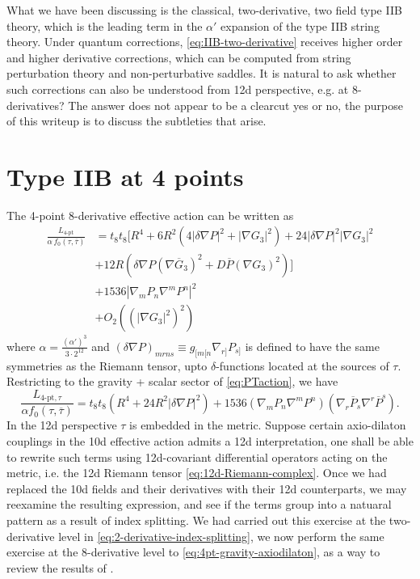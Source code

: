 What we have been discussing is the classical, two-derivative, two field type IIB theory, which is the leading term in the $\alpha'$ expansion of the type IIB string theory.
Under quantum corrections, \eqref{eq:IIB-two-derivative} receives higher order and higher derivative corrections, which can be computed from string perturbation theory and non-perturbative saddles.
It is natural to ask whether such corrections can also be understood from 12d perspective, e.g. at 8-derivatives?
The answer does not appear to be a clearcut yes or no, the purpose of this writeup is to discuss the subtleties that arise.

\section{Type IIB at 4 points}

The 4-point 8-derivative effective action can be written \cite{Liu:2025uqu,Minasian:2015bxa,Policastro:2008hg} as
\begin{equation}
\begin{aligned}
\frac{L_{\text{4-pt}}}{\alpha\, f_{0}(\tau,\overline{\tau})}
&= t_{8}t_{8} \biggl[R^4+6R^{2}\left(4|\delta\nabla P|^{2}+|\nabla G_{3}|^{2}\right)+24|\delta \nabla P|^{2}|\nabla G_{3}|^{2}\\
&+12R\left(\delta \nabla P(\nabla\overline{G}_{3})^{2}+D\overline{P}(\nabla{G}_{3})^{2}\right)\biggr]\\
&+1536 |\nabla_m P_n \nabla^m P^n|^2\\
&+O_{2}\left((|\nabla G_{3}|^{2})^{2}\right)
\label{eq:PTaction}
\end{aligned}
\end{equation}
where $\alpha = \frac{(\alpha')^3}{3 \cdot 2^{12}}$ and $(\delta \nabla P)_{mrns} \equiv g_{[m[n} \nabla_{r]} P_{s]}$ is defined to have the same symmetries as the Riemann tensor, upto $\delta$-functions located at the sources of $\tau$.
Restricting to the gravity + scalar sector of \eqref{eq:PTaction}, we have
\begin{equation}
\frac{L_{\text{4-pt},\tau}}{\alpha f_0(\tau,\overline{\tau})} = t_8t_8
(R^4 + 24 R^2 |\delta \nabla P|^2) + 1536 (\nabla_m P_n \nabla^m P^n)(\nabla_r \overline{P}_s \nabla^r \overline{P}^s).
\label{eq:4pt-gravity-axiodilaton}
\end{equation}
In the 12d perspective $\tau$ is embedded in the metric.
Suppose certain axio-dilaton couplings in the 10d effective action admits a 12d interpretation, one shall be able to rewrite such terms using 12d-covariant differential operators acting on the metric, i.e. the 12d Riemann tensor \eqref{eq:12d-Riemann-complex}. 
Once we had replaced the 10d fields and their derivatives with their 12d counterparts, we may reexamine the resulting expression, and see if the terms group into a natuaral pattern as a result of index splitting.
We had carried out this exercise at the two-derivative level in \eqref{eq:2-derivative-index-splitting}, we now perform the same exercise at the 8-derivative level to \eqref{eq:4pt-gravity-axiodilaton}, as a way to review the results of \cite{Minasian:2015bxa}.

